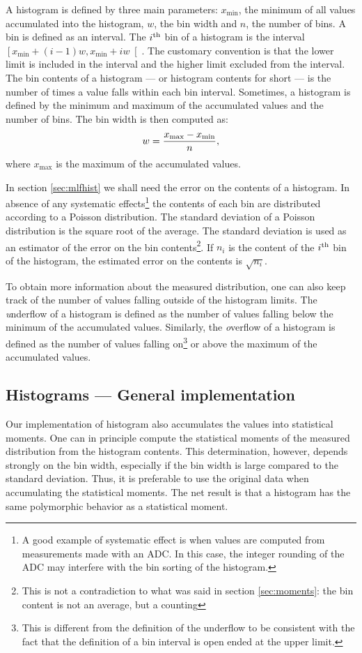 A histogram is defined by three main parameters: $x_{\min}$, the
minimum of all values accumulated into the histogram, $w$, the bin
width and $n$, the number of bins. A bin is defined as an
interval. The $i^{\mathop{\textrm{th}}}$ bin of a histogram is the interval $\left[
x_{\min}+\left(i-1\right)w, x_{\min}+iw\right[$. The customary
convention is that the lower limit is included in the interval and
the higher limit excluded from the interval. The bin contents of a
histogram --- or histogram contents for short --- is the number of
times a value falls within each bin interval. Sometimes, a
histogram is defined by the minimum and maximum of the accumulated
values and the number of bins. The bin width is then computed as:
\begin{equation}
  w = {x_{\max} - x_{\min} \over n},
\end{equation}
where $x_{\max}$ is the maximum of the accumulated values.

In section \ref{sec:mlfhist} we shall need the error on the
contents of a histogram. In absence of any systematic
effects\footnote{A good example of systematic effect is when
values are computed from measurements made with an ADC. In this
case, the integer rounding of the ADC may interfere with the bin
sorting of the histogram.} the contents of each bin are
distributed according to a Poisson distribution. The standard
deviation of a Poisson distribution is the square root of the
average. The standard deviation is used as an estimator of the
error on the bin contents\footnote{This is not a contradiction to
what was said in section \ref{sec:moments}: the bin content is not
an average, but a counting}. If $n_i$ is the content of the $i^{\mathop{\textrm{th}}}$
bin of the histogram, the estimated error on the contents is
$\sqrt{n_i}$.

To obtain more information about the measured distribution, one
can also keep track of the number of values falling outside of the
histogram limits. The {\textsl underflow} of a histogram is defined as
the number of values falling below the minimum  of the accumulated
values. Similarly, the {\textsl overflow} of a histogram is defined as
the number of values falling on\footnote{This is different from
the definition of the underflow to be consistent with the fact
that the definition of a bin interval is open ended at the upper
limit.} or above the maximum of the accumulated values.

\subsection{Histograms --- General implementation}
 Our implementation of histogram also
accumulates the values into statistical moments. One can in
principle compute the statistical moments of the measured
distribution from the histogram contents. This determination,
however, depends strongly on the bin width, especially if the bin
width is large compared to the standard deviation. Thus, it is
preferable to use the original data when accumulating the
statistical moments. The net result is that a histogram has the
same polymorphic behavior as a statistical moment.

